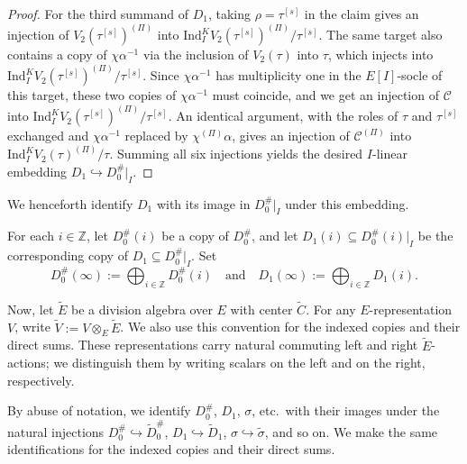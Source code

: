 \documentclass[a4paper,10pt,twoside]{amsart}
\theoremstyle{definition}
\numberwithin{equation}{section}
\begin{document}
\begin{proof}
For the third summand of \(D_1\), taking
\(\rho=\tau^{[s]}\) in the claim gives an injection of
\(V_2(\tau^{[s]})^{(\Pi)}\) into
\(\mathrm{Ind}_I^K V_2(\tau^{[s]})^{(\Pi)}/\tau^{[s]}\).
 The same target also contains a copy of $\chi\alpha^{-1}$ via the inclusion of $V_2(\tau)$ into $\tau$, which injects into $\mathrm{Ind}_I^K V_2(\tau^{[s]})^{(\Pi)}/\tau^{[s]}$. Since $\chi\alpha^{-1}$ has multiplicity one in the $E[I]$-socle of this target, these two copies of $\chi\alpha^{-1}$ must coincide, and we get an injection of $\mathcal C$ into $\mathrm{Ind}_I^K V_2(\tau^{[s]})^{(\Pi)}/\tau^{[s]}$. An identical argument, with the roles of $\tau$ and $\tau^{[s]}$ exchanged and $\chi\alpha^{-1}$ replaced by $\chi^{(\Pi)}\alpha$, gives an injection of $\mathcal C^{(\Pi)}$ into $\mathrm{Ind}_I^K V_2(\tau)^{(\Pi)}/\tau$. Summing all six injections yields the desired $I$-linear embedding $D_1 \hookrightarrow D_0^\#|_I$.
\end{proof}
We henceforth identify $D_1$ with its image in $D_0^\#|_I$ under this embedding.

For each \(i\in\mathbb{Z}\), let \(D_0^\#(i)\) be a copy of
\(D_0^\#\), and let $D_1(i)\subseteq D_0^\#(i)|_I
$ be the corresponding copy of \(D_1\subseteq D_0^\#|_I\). Set
\[
D_0^\#(\infty):=\bigoplus_{i\in\mathbb{Z}}D_0^\#(i)
\quad \text{and} \quad
D_1(\infty):=\bigoplus_{i\in\mathbb{Z}}D_1(i).
\]

Now, let \(\widetilde E\) be a division algebra over \(E\) with center
\(\widetilde C\). For any \(E\)-representation \(V\), write
\(\widetilde V:=V\otimes_E\widetilde E\). We also use this convention for the indexed copies and their direct sums. These representations
carry natural commuting left and right \(\widetilde E\)-actions; we
distinguish them by writing scalars on the left and on the right,
respectively.

By abuse of notation, we identify \(D_0^\#\), \(D_1\), \(\sigma\),
etc.\ with their images under the natural injections $D_0^\#\hookrightarrow\widetilde D_0^\#$, $D_1\hookrightarrow\widetilde D_1$, $\sigma\hookrightarrow\widetilde\sigma$, and so on. We make the same identifications for the indexed copies and their direct sums.
\end{document}
